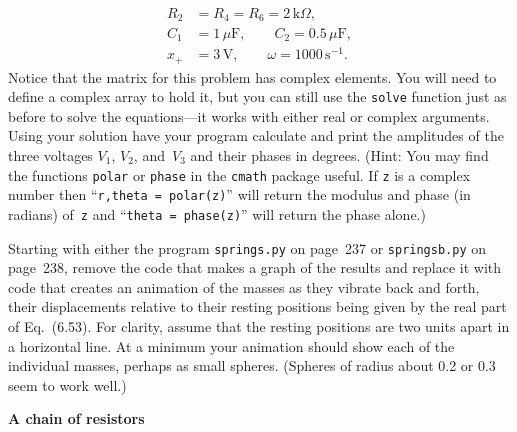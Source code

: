 \documentclass[12pt]{article}
\begin{document}
\begin{exercises}
\begin{enumerate}
\begin{align*}
R_2 &= R_4 = R_6 = 2\,\mathrm{k}\Omega, \\
C_1 &= 1\,\mu\mathrm{F},\qquad C_2 = 0.5\,\mu\mathrm{F}, \\
x_+ &= 3\,\mathrm{V},\qquad \omega = 1000\,\mathrm{s}^{-1}.
\end{align*}
Notice that the matrix for this problem has complex elements.  You will
need to define a complex array to hold it, but you can still use the
\verb|solve| function just as before to solve the equations---it works with
either real or complex arguments.  Using your solution have your program
calculate and print the amplitudes of the three voltages $V_1$, $V_2$,
and~$V_3$ and their phases in degrees.  (Hint: You may find the functions
\verb|polar| or \verb|phase| in the \verb|cmath| package useful.  If
\verb|z| is a complex number then ``\verb|r,theta = polar(z)|'' will return
the modulus and phase (in radians) of~\verb|z| and
``\verb|theta = phase(z)|'' will return the phase alone.)
\end{enumerate}



\exercise Starting with either the program \verb|springs.py| on page~237 or
\verb|springsb.py| on page~238, remove the code that makes a graph of the
results and replace it with code that creates an animation of the masses as
they vibrate back and forth, their displacements relative to their resting
positions being given by the real part of Eq.~(6.53).  For clarity, assume
that the resting positions are two units apart in a horizontal line.  At a
minimum your animation should show each of the individual masses, perhaps
as small spheres.  (Spheres of radius about 0.2 or 0.3 seem to work well.)



\exercise \textbf{A chain of resistors}


\end{exercises}
\end{document}
